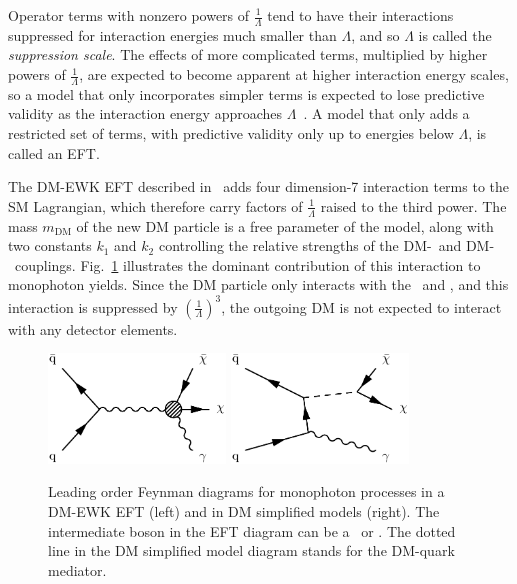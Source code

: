 \documentclass[oneside, letterpaper, 12pt, oldfontcommands]{memoir}
\begin{document}
Operator terms with nonzero powers of $\frac{1}{\Lambda}$ tend to have their interactions suppressed for interaction energies much
smaller than $\Lambda$, and so $\Lambda$ is called the \textit{suppression scale}. The effects of more complicated terms, multiplied by higher powers of $\frac{1}{\Lambda}$,
are expected to become apparent at higher interaction energy scales, so a model that only incorporates simpler terms is expected to
lose predictive validity as the interaction energy approaches $\Lambda$~\cite{ref:j.aop.2013.04.016}. A model that only adds a restricted set of terms,
with predictive validity only up to energies below $\Lambda$, is called an EFT.

The DM-EWK EFT described in~\cite{ref:PhysRevD.89.056011} adds four dimension-7 interaction terms to the SM Lagrangian, which therefore carry factors of $\frac{1}{\Lambda}$
raised to the third power. The mass $m_\mathrm{DM}$ of the new DM particle is a free parameter of the model, along with two constants $k_1$ and $k_2$ controlling
the relative strengths of the DM-\PZ\ and DM-\Pgamma\ couplings.
Fig.~\ref{fig:dm_diagrams} illustrates the dominant contribution of this interaction to monophoton yields. Since the DM
particle only interacts with the \PZ\ and \Pgamma, and this interaction is suppressed by $(\frac{1}{\Lambda})^{3}$, the outgoing DM is not expected to interact
with any detector elements.

\begin{figure}[hbtp]
  \begin{center}
    \includegraphics[width=0.42\textwidth]{Figures/dmewk.pdf}
    \includegraphics[width=0.42\textwidth]{Figures/dm.pdf}
    \caption{
      Leading order Feynman diagrams for monophoton processes in a DM-EWK EFT (left) and in DM simplified models (right).
      The intermediate boson in the EFT diagram can be a \PZ\ or \Pgamma. The dotted line in the DM simplified model diagram
      stands for the DM-quark mediator.
    }
    \label{fig:dm_diagrams}
  \end{center}
\end{figure}
\end{document}
